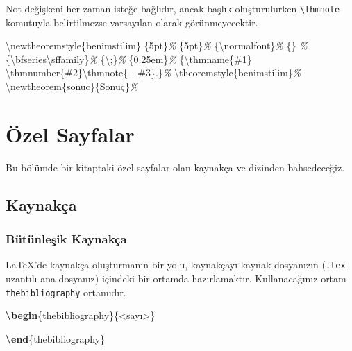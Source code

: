 \documentclass[
  10pt,
]{scrbook}
\newenvironment{Shaded}{\begin{snugshade}}{\end{snugshade}}
\newcommand{\CommentTok}[1]{\textcolor[rgb]{0.56,0.35,0.01}{\textit{#1}}}
\newcommand{\ExtensionTok}[1]{#1}
\newcommand{\FunctionTok}[1]{\textcolor[rgb]{0.00,0.00,0.00}{#1}}
\newcommand{\KeywordTok}[1]{\textcolor[rgb]{0.13,0.29,0.53}{\textbf{#1}}}
\newcommand{\NormalTok}[1]{#1}
\theoremstyle{definition}
\theoremstyle{definition}
\theoremstyle{definition}
\theoremstyle{definition}
\theoremstyle{remark}
\begin{document}
Not değişkeni her zaman isteğe bağlıdır, ancak başlık oluşturulurken \texttt{\textbackslash{}thmnote} komutuyla belirtilmezse varsayılan olarak görünmeyecektir.

\begin{Shaded}
\begin{Highlighting}[]
\FunctionTok{\textbackslash{}newtheoremstyle}\NormalTok{\{benimstilim\}}
\NormalTok{\{5pt\}}\CommentTok{\% }
\NormalTok{\{5pt\}}\CommentTok{\% }
\NormalTok{\{}\FunctionTok{\textbackslash{}normalfont}\NormalTok{\}}\CommentTok{\% }
\NormalTok{\{\} }\CommentTok{\%}
\NormalTok{\{}\FunctionTok{\textbackslash{}bfseries\textbackslash{}sffamily}\NormalTok{\}}\CommentTok{\%}
\NormalTok{\{}\FunctionTok{\textbackslash{};}\NormalTok{\}}\CommentTok{\% }
\NormalTok{\{0.25em\}}\CommentTok{\% }
\NormalTok{\{}\FunctionTok{\textbackslash{}thmname}\NormalTok{\{\#1\} }\FunctionTok{\textbackslash{}thmnumber}\NormalTok{\{\#2\}}\FunctionTok{\textbackslash{}thmnote}\NormalTok{\{{-}{-}{-}\#3\}.\}}\CommentTok{\%}
\FunctionTok{\textbackslash{}theoremstyle}\NormalTok{\{benimstilim\}}\CommentTok{\%}
\FunctionTok{\textbackslash{}newtheorem}\NormalTok{\{sonuc\}\{Sonuç\}}\CommentTok{\%}
\end{Highlighting}
\end{Shaded}

\hypertarget{uxf6zel-sayfalar}{%
\chapter{Özel Sayfalar}\label{uxf6zel-sayfalar}}

Bu bölümde bir kitaptaki özel sayfalar olan kaynakça ve dizinden bahsedeceğiz.

\hypertarget{kaynakuxe7a}{%
\section{Kaynakça}\label{kaynakuxe7a}}

\hypertarget{buxfctuxfcnleux15fik-kaynakuxe7a}{%
\subsection{Bütünleşik Kaynakça}\label{buxfctuxfcnleux15fik-kaynakuxe7a}}

LaTeX'de kaynakça oluşturmanın bir yolu, kaynakçayı kaynak dosyanızın (\texttt{.tex} uzantılı ana dosyanız) içindeki bir ortamda hazırlamaktır. Kullanacağınız ortam \texttt{thebibliography} ortamıdır.

\begin{Shaded}
\begin{Highlighting}[]
\KeywordTok{\textbackslash{}begin}\NormalTok{\{}\ExtensionTok{thebibliography}\NormalTok{\}\{\textless{}sayı\textgreater{}\}}

\KeywordTok{\textbackslash{}end}\NormalTok{\{}\ExtensionTok{thebibliography}\NormalTok{\}}
\end{Highlighting}
\end{Shaded}
\end{document}
